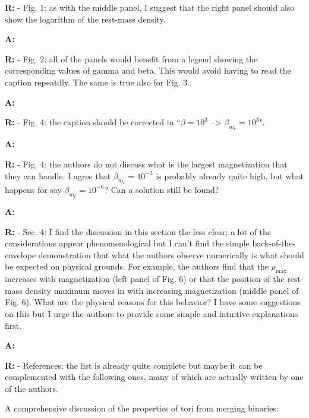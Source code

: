 \documentclass{article}
\begin{document}
{\bf R:} - Fig. 1: as with the middle panel, I suggest that the right
panel should also show the logarithm of the rest-mass density.

\bigskip

{\bf A:} 

\bigskip

{\bf R:} - Fig. 2: all of the panels would benefit from a legend showing the
corresponding values of gamma and beta. This would avoid having to read the caption repeatdly. The same is true also for Fig. 3.

\bigskip

{\bf A:} 

\bigskip

{\bf R:} - Fig. 4: the caption should be corrected in ``$\beta = 10^3$ --> $\beta_{m_c}
= 10^3$".

\bigskip

{\bf A:} 

\bigskip

{\bf R:} - Fig. 4: the authors do not discuss what is the largest magnetization
that they can handle. I agree that $\beta_{m_c} = 10^{-3}$ is probably
already quite high, but what happens for say $\beta_{m_c} = 10^{-6}$? Can
a solution still be found?

\bigskip

{\bf A:} 

\bigskip

{\bf R:} - Sec. 4: I find the discussion in this section the less clear; a lot
of the considerations appear phenomenological but I can't find the
simple back-of-the-envelope demonstration that what the authors observe
numerically is what should be expected on physical grounds. For
example, the authors find that the $\rho_{\mathrm{max}}$ increases with magnetization
(left panel of Fig. 6) or that the position of the rest-mass density
maximum moves in with increasing magnetization (middle panel of
Fig. 6). What are the physical reasons for this behavior? I have some
suggestions on this but I urge the authors to provide some simple and
intuitive explanations first.

\bigskip

{\bf A:}

\bigskip

{\bf R:} - References: the list is already quite complete but maybe it can be
complemented with the following ones, many of which are actually
written by one of the authors.

A comprehensive discussion of the properties of tori from merging binaries:
\end{document}
